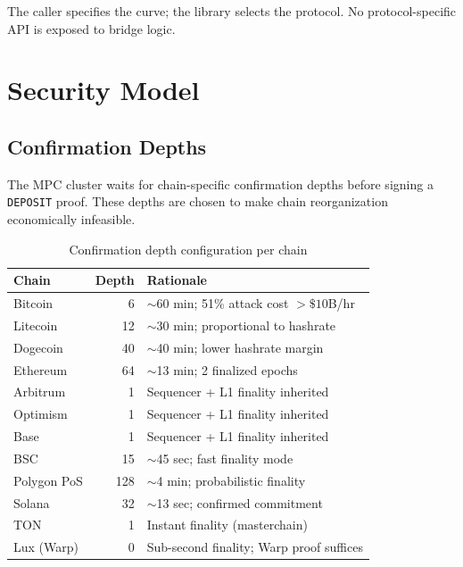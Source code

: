 \documentclass[11pt]{article}
\begin{document}
The caller specifies the curve; the library selects the protocol. No protocol-specific API is exposed to bridge logic.

\section{Security Model}
\label{sec:security}

\subsection{Confirmation Depths}
\label{sec:depths}

The MPC cluster waits for chain-specific confirmation depths before signing a \texttt{DEPOSIT} proof. These depths are chosen to make chain reorganization economically infeasible.

\begin{table}[H]
\centering
\begin{tabular}{lrl}
\toprule
\textbf{Chain} & \textbf{Depth} & \textbf{Rationale} \\
\midrule
Bitcoin        & 6    & $\sim$60 min; 51\% attack cost $>\$10$B/hr \\
Litecoin       & 12   & $\sim$30 min; proportional to hashrate \\
Dogecoin       & 40   & $\sim$40 min; lower hashrate margin \\
Ethereum       & 64   & $\sim$13 min; 2 finalized epochs \\
Arbitrum       & 1    & Sequencer + L1 finality inherited \\
Optimism       & 1    & Sequencer + L1 finality inherited \\
Base           & 1    & Sequencer + L1 finality inherited \\
BSC            & 15   & $\sim$45 sec; fast finality mode \\
Polygon PoS    & 128  & $\sim$4 min; probabilistic finality \\
Solana         & 32   & $\sim$13 sec; confirmed commitment \\
TON            & 1    & Instant finality (masterchain) \\
Lux (Warp)     & 0    & Sub-second finality; Warp proof suffices \\
\bottomrule
\end{tabular}
\caption{Confirmation depth configuration per chain}
\label{tab:depths}
\end{table}
\end{document}
